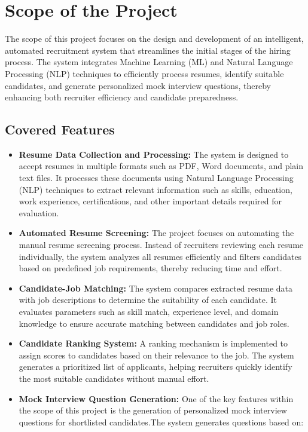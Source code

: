\section{Scope of the Project}
{%
The scope of this project focuses on the design and development of an intelligent, automated recruitment system that streamlines the initial stages of the hiring process. The system integrates Machine Learning (ML) and Natural Language Processing (NLP) techniques to efficiently process resumes, identify suitable candidates, and generate personalized mock interview questions, thereby enhancing both recruiter efficiency and candidate preparedness.}

\subsection{Covered Features}

\begin{itemize}

\item \textbf{Resume Data Collection and Processing:}  
The system is designed to accept resumes in multiple formats such as PDF, Word documents, and plain text files. It processes these documents using Natural Language Processing (NLP) techniques to extract relevant information such as skills, education, work experience, certifications, and other important details required for evaluation.

\item \textbf{Automated Resume Screening:}  
The project focuses on automating the manual resume screening process. Instead of recruiters reviewing each resume individually, the system analyzes all resumes efficiently and filters candidates based on predefined job requirements, thereby reducing time and effort.

\item \textbf{Candidate-Job Matching:}  
The system compares extracted resume data with job descriptions to determine the suitability of each candidate. It evaluates parameters such as skill match, experience level, and domain knowledge to ensure accurate matching between candidates and job roles.
\item \textbf{Candidate Ranking System:}  
A ranking mechanism is implemented to assign scores to candidates based on their relevance to the job. The system generates a prioritized list of applicants, helping recruiters quickly identify the most suitable candidates without manual effort.

\item \textbf{Mock Interview Question Generation:}  
One of the key features within the scope of this project is the generation of personalized mock interview questions for shortlisted candidates.The system generates questions based on:
\end{itemize}


